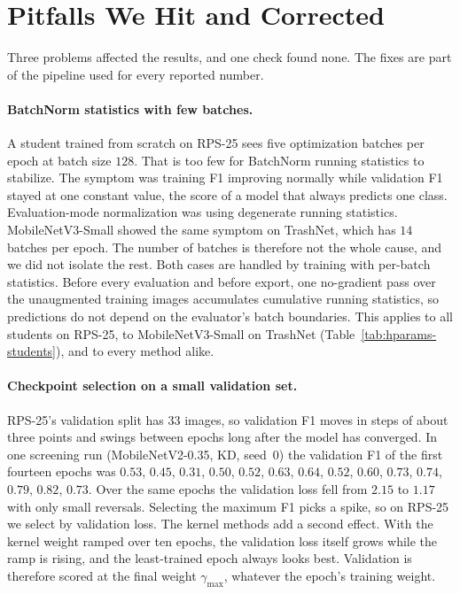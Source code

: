 \appendix

\section{Pitfalls We Hit and Corrected}
\label{app:pitfalls}

Three problems affected the results, and one check found none. The fixes are part of the pipeline used for every reported number.

\paragraph{BatchNorm statistics with few batches.}
A student trained from scratch on RPS-25 sees five optimization batches per epoch at batch size $128$. That is too few for BatchNorm running statistics to stabilize.
The symptom was training F1 improving normally while validation F1 stayed at one constant value, the score of a model that always predicts one class. Evaluation-mode normalization was using degenerate running statistics.
MobileNetV3-Small showed the same symptom on TrashNet, which has $14$ batches per epoch. The number of batches is therefore not the whole cause, and we did not isolate the rest.
Both cases are handled by training with per-batch statistics. Before every evaluation and before export, one no-gradient pass over the unaugmented training images accumulates cumulative running statistics, so predictions do not depend on the evaluator's batch boundaries.
This applies to all students on RPS-25, to MobileNetV3-Small on TrashNet (Table~\ref{tab:hparams-students}), and to every method alike.

\paragraph{Checkpoint selection on a small validation set.}
RPS-25's validation split has $33$ images, so validation F1 moves in steps of about three points and swings between epochs long after the model has converged.
In one screening run (MobileNetV2-0.35, KD, seed~0) the validation F1 of the first fourteen epochs was $0.53$, $0.45$, $0.31$, $0.50$, $0.52$, $0.63$, $0.64$, $0.52$, $0.60$, $0.73$, $0.74$, $0.79$, $0.82$, $0.73$. Over the same epochs the validation loss fell from $2.15$ to $1.17$ with only small reversals.
Selecting the maximum F1 picks a spike, so on RPS-25 we select by validation loss.
The kernel methods add a second effect. With the kernel weight ramped over ten epochs, the validation loss itself grows while the ramp is rising, and the least-trained epoch always looks best.
Validation is therefore scored at the final weight $\gamma_{\max}$, whatever the epoch's training weight.

